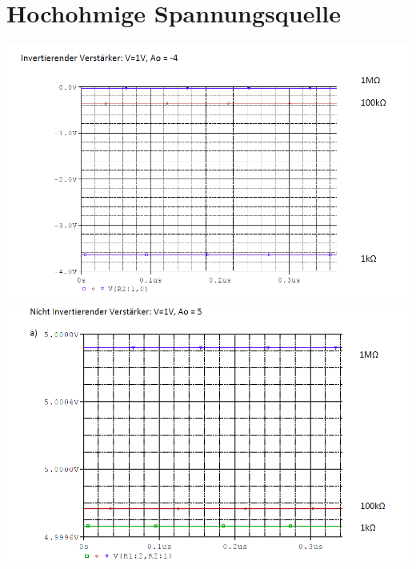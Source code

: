 \documentclass[a4paper]{article}
\begin{document}
\section*{Hochohmige Spannungsquelle}
\includegraphics[scale=0.6]{SimulationInverter_a)}
\\[0.5cm]
\includegraphics[scale=0.6]{SimulationInverter_a)_1}
\end{document}
